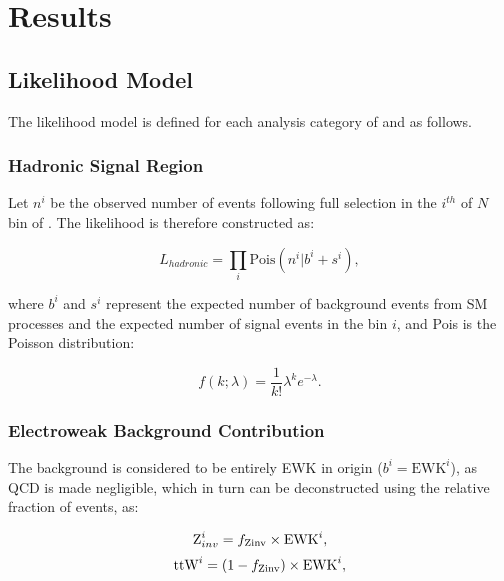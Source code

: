 \chapter{Results}
\label{ch:7}

\ifpdf
    \graphicspath{{Chapter7/Figs/Raster/}{Chapter7/Figs/PDF/}{Chapter7/Figs/}}
\else
    \graphicspath{{Chapter7/Figs/Vector/}{Chapter7/Figs/}}
\fi


\section{Likelihood Model}  %
\label{sec:results_likelihood}
The likelihood model is defined for each analysis category of \nb and \nj as 
follows.

\subsection{Hadronic Signal Region}

Let $n^i$ be the observed number of events 
following full selection in the $i^{th}$ of $N$ bin of \HT. The likelihood is 
therefore constructed as:

\begin{equation}
L_{hadronic} = \prod_i \text{Pois}(n^i | b^i + s^i),
\end{equation}

where $b^i$ and $s^i$ represent the expected number of background events from SM 
processes and the expected number of signal events in the bin $i$, and Pois is 
the Poisson distribution:

\begin{equation}
f(k;\lambda) = \frac{1}{k!}\lambda^k e^{-\lambda}.
\end{equation}


\subsection{Electroweak Background Contribution}
The background is considered to be entirely EWK in origin ($b^i = \text{EWK}^i$), as QCD
is made negligible, which in turn can be deconstructed using the relative fraction
of \zinv events, \fzinv as:

\begin{equation}
\text{Z}_{inv}^i = f_{\text{Zinv}} \times \text{EWK}^i,
\label{eq:ewk_frac_z}
\end{equation}
\begin{equation}
\text{ttW}^i = (1-f_{\text{Zinv}}) \times \text{EWK}^i,
\label{eq:ewk_frac_ttw}
\end{equation}

